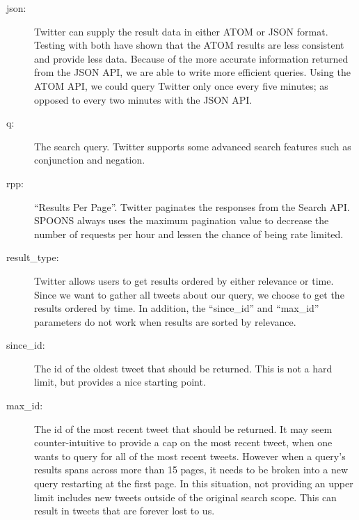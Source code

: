 \documentclass[12pt]{ucthesis}
\begin{document}
\begin{description}

\item[json:]
Twitter can supply the result data in either ATOM or JSON format. Testing with both have shown that the ATOM
results are less consistent and provide less data. Because of the more accurate information returned from the JSON
API, we are able to write more efficient queries. Using the ATOM API, we could query Twitter only once every five
minutes; as opposed to every two minutes with the JSON API.

\item[q:]
The search query. Twitter supports some advanced search features such as conjunction and negation.

\item[rpp:]
``Results Per Page''. Twitter paginates the responses from the Search API. SPOONS always uses the maximum pagination value to decrease the number of requests per hour and lessen the chance of being rate limited.

\item[result\_type:]
Twitter allows users to get results ordered by either relevance or time. Since we want to gather all tweets about
our query, we choose to get the results ordered by time. In addition, the ``since\_id'' and ``max\_id''
parameters do not work when results are sorted by relevance.

\item[since\_id:]
The id of the oldest tweet that should be returned. This is not a hard limit, but provides a nice starting point.

\item[max\_id:]
The id of the most recent tweet that should be returned. It may seem counter-intuitive to provide a cap on the
most recent tweet, when one wants to query for all of the most recent tweets. However when a query's results spans across
more than 15 pages, it needs to be broken into a new query restarting at the first page. In this situation,
not providing an upper limit includes new tweets outside of the original search scope. This can result in tweets that are forever lost to us.

\end{description}
\end{document}
